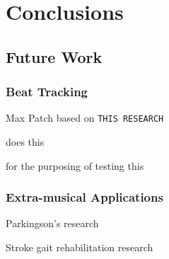 
\chapter{Conclusions} \label{chapConclusions}


\section{Future Work}

\subsection{Beat Tracking}

Max Patch based on \verb!THIS RESEARCH! 

does this

for the purposing of testing this

\subsection{Extra-musical Applications}

Parkingson's research

Stroke gait rehabilitation research
